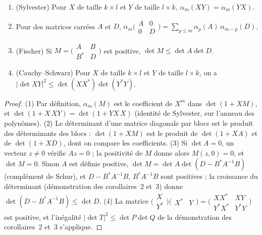 \begin{lemme}\label{lem:1-matrices}\leavevmode
\begin{enumerate}
\item (Sylvester) Pour $X$ de taille $k \times l$ et $Y$ de taille $l \times k$, $\alpha_m(XY) = \alpha_m(YX)$.
\item Pour des matrices carrées $A$ et $D$, $\alpha_m\bigl(\begin{smallmatrix} A & 0 \\ 0 & D\end{smallmatrix}\bigr) = \sum_{p \leq m} \alpha_p(A)\,\alpha_{m-p}(D)$.
\item (Fischer) Si $M = \bigl(\begin{smallmatrix} A & B \\ B^* & D\end{smallmatrix}\bigr)$ est positive, $\det M \leq \det A \det D$.
\item (Cauchy--Schwarz) Pour $X$ de taille $k \times l$ et $Y$ de taille $l \times k$, on a $|\det XY|^2 \leq \det(XX^*) \det(Y^*Y)$.
\end{enumerate}
\end{lemme}

\begin{proof}
(1) Par définition, $\alpha_m(M)$ est le coefficient de $X^m$ dans $\det(1 + XM)$, et $\det(1 + X\,XY) = \det(1 + YX\,X)$ (identité de Sylvester, sur l'anneau des polynômes). (2) Le déterminant d'une matrice diagonale par blocs est le produit des déterminants des blocs : $\det(1 + XM)$ est le produit de $\det(1 + XA)$ et de $\det(1 + XD)$, dont on compare les coefficients. (3) Si $\det A = 0$, un vecteur $z \neq 0$ vérifie $Az = 0$ ; la positivité de $M$ donne alors $M(z, 0) = 0$, et $\det M = 0$. Sinon $A$ est définie positive, $\det M = \det A \det(D - B^*A^{-1}B)$ (complément de Schur), et $D - B^*A^{-1}B$, $B^*A^{-1}B$ sont positives ; la croissance du déterminant (démonstration des corollaires~2 et~3) donne $\det(D - B^*A^{-1}B) \leq \det D$. (4) La matrice $\bigl(\begin{smallmatrix} X \\ Y^* \end{smallmatrix}\bigr)\bigl(\begin{smallmatrix} X^* & Y \end{smallmatrix}\bigr) = \bigl(\begin{smallmatrix} XX^* & XY \\ Y^*X^* & Y^*Y \end{smallmatrix}\bigr)$ est positive, et l'inégalité $|\det T|^2 \leq \det P \det Q$ de la démonstration des corollaires~2 et~3 s'applique.
\end{proof}

